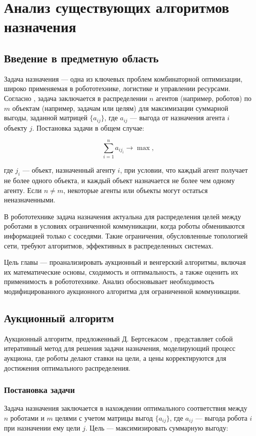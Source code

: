 \chapter{Анализ существующих алгоритмов назначения}
\label{ch:analysis}

\section{Введение в предметную область}
Задача назначения --- одна из ключевых проблем комбинаторной оптимизации, широко применяемая в робототехнике, логистике и управлении ресурсами. Согласно \cite{bertsekas1990}, задача заключается в распределении \( n \) агентов (например, роботов) по \( m \) объектам (например, задачам или целям) для максимизации суммарной выгоды, заданной матрицей \( \{a_{ij}\} \), где \( a_{ij} \) --- выгода от назначения агента \( i \) объекту \( j \). Постановка задачи в общем случае:

\[
\sum_{i=1}^n a_{i j_i} \to \max,
\]

\noindent где \( j_i \) --- объект, назначенный агенту \( i \), при условии, что каждый агент получает не более одного объекта, и каждый объект назначается не более чем одному агенту. Если \( n \neq m \), некоторые агенты или объекты могут остаться неназначенными.

В робототехнике задача назначения актуальна для распределения целей между роботами в условиях ограниченной коммуникации, когда роботы обмениваются информацией только с соседями. Такие ограничения, обусловленные топологией сети, требуют алгоритмов, эффективных в распределенных системах.

Цель главы --- проанализировать аукционный и венгерский алгоритмы, включая их математические основы, сходимость и оптимальность, а также оценить их применимость в робототехнике. Анализ обосновывает необходимость модифицированного аукционного алгоритма для ограниченной коммуникации.


\section{Аукционный алгоритм}
Аукционный алгоритм, предложенный Д. Бертсекасом \cite{bertsekas1990}, представляет собой итеративный метод для решения задачи назначения, моделирующий процесс аукциона, где роботы делают ставки на цели, а цены корректируются для достижения оптимального распределения.

\subsection{Постановка задачи}
Задача назначения заключается в нахождении оптимального соответствия между \( n \) роботами и \( m \) целями с учетом матрицы выгод \( \{a_{ij}\} \), где \( a_{ij} \) --- выгода робота \( i \) при назначении ему цели \( j \). Цель --- максимизировать суммарную выгоду:


